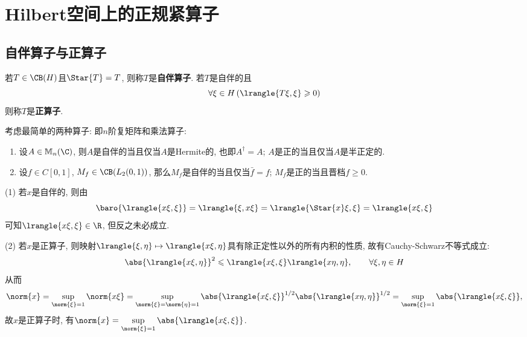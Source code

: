 \section{Hilbert空间上的正规紧算子}

	\subsection{自伴算子与正算子}
	
	\begin{Definition}
	若$ T\in\CB(H) $且$ \Star{T}=T $, 则称$ T $是\textbf{自伴算子}. 若$ T $是自伴的且
	\[
	\forall \xi\in H\,(\lrangle{T\xi,\xi}\geqslant 0)
	\]
	则称$ T $是\textbf{正算子}.
	\end{Definition}
	
	\begin{Example}
	考虑最简单的两种算子: 即$ n $阶复矩阵和乘法算子:
	\begin{enumerate}[(1)]
	\item 设$ A\in\mathbb{M}_n(\C) $, 则$ A $是自伴的当且仅当$ A $是Hermite的, 也即$ A^\dagger=A $; $ A $是正的当且仅当$ A $是半正定的.
	\item 设$ f\in C[0,1] $, $ M_f\in\CB(L_2(0,1)) $, 那么$ M_f $是自伴的当且仅当$ \bar{f}=f $; $ M_f $是正的当且晋档$ f\geqslant 0 $.
	\end{enumerate}
	\end{Example}
	
	\begin{Remark}
	(1) 若$ x $是自伴的, 则由
	\[
	\baro{\lrangle{x\xi,\xi}}=\lrangle{\xi,x\xi}=\lrangle{\Star{x}\xi,\xi}=\lrangle{x\xi,\xi}
	\]
	可知$ \lrangle{x\xi,\xi}\in\R $, 但反之未必成立.
	
	(2) 若$ x $是正算子, 则映射$ \lrangle{\xi,\eta}\mapsto\lrangle{x\xi,\eta} $具有除正定性以外的所有内积的性质, 故有Cauchy-Schwarz不等式成立:
	\[
	\abs{\lrangle{x\xi,\eta}}^2\leqslant\lrangle{x\xi,\xi}\lrangle{x\eta,\eta},\qquad\forall \xi,\eta\in H
	\]
	从而
	\[
	\norm{x}=\sup_{\norm{\xi}=1}\norm{x\xi}=\sup_{\norm{\xi}=\norm{\eta}=1}\abs{\lrangle{x\xi,\xi}}^{1/2}\abs{\lrangle{x\eta,\eta}}^{1/2}=\sup_{\norm{\xi}=1}\abs{\lrangle{x\xi,\xi}},
	\]
	故$ x $是正算子时, 有$ \norm{x}=\sup\limits_{\norm{\xi}=1}\abs{\lrangle{x\xi,\xi}} $.
	\end{Remark}
	
